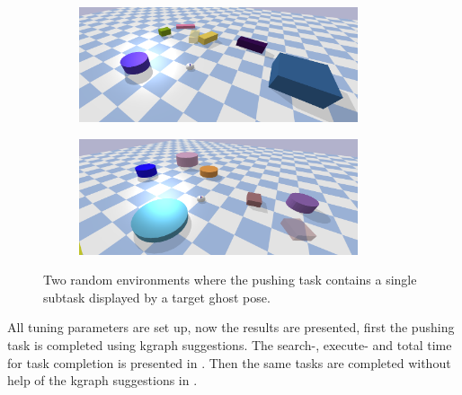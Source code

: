 \begin{figure}[H]
    \centering
    \begin{subfigure}{\textwidth}
    \centering
    \includegraphics[width=0.9\textwidth]{figures/results/random_1}
    \end{subfigure}

    \vspace{0.2cm}
    \begin{subfigure}{\textwidth}
    \centering
    \includegraphics[width=0.9\textwidth]{figures/results/random_2}
    \end{subfigure}
    \caption{Two random environments where the pushing task contains a single subtask displayed by a target ghost pose.}%
    \label{fig:random_environnment}
\end{figure}

All tuning parameters are set up, now the results are presented, first the pushing task is completed using \ac{kgraph} suggestions. The search-, execute- and total time for task completion is presented in . Then the same tasks are completed without help of the \ac{kgraph} suggestions in . 

